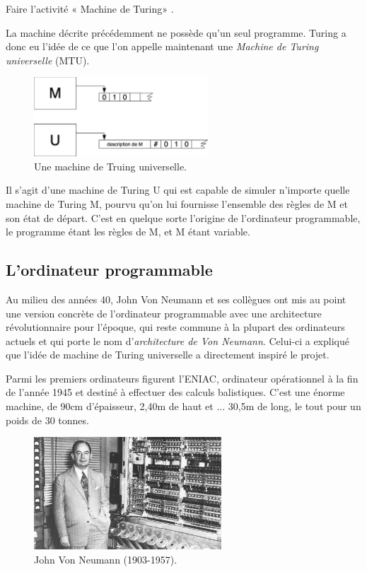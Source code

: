 \begin{exercice}[]
    Faire l'activité « Machine de Turing» .
\end{exercice}

La machine décrite précédemment ne possède qu'un seul programme. Turing a donc eu l'idée de ce que l'on appelle maintenant une
\textit{Machine de Turing universelle} (MTU).

\begin{figure}[H]
    \begin{center}
        \includegraphics[width=6.5cm]{ch-turing/img/mtu.png}
    \end{center}
    \caption*{Une machine de Truing universelle.}
\end{figure}

Il s'agit d'une machine de Turing U qui est capable de simuler n'importe quelle machine de Turing M,
pourvu qu'on lui fournisse l'ensemble des règles de M et son état de départ. C'est en quelque sorte l'origine de l'ordinateur
programmable, le programme étant les règles de M, et M étant variable.

\subsection{L'ordinateur programmable}

Au milieu des années 40, John Von Neumann et ses collègues ont mis au point une version concrète de l'ordinateur programmable avec une architecture révolutionnaire pour l'époque, qui reste commune à la plupart des ordinateurs actuels et qui porte le nom d'\textit{architecture de Von Neumann}. Celui-ci a expliqué que l'idée de machine de Turing universelle a directement inspiré le projet.

Parmi les premiers ordinateurs figurent l'ENIAC, ordinateur opérationnel à la fin de l'année 1945 et destiné à effectuer des calculs balistiques. C'est une énorme machine, de 90cm d'épaisseur, 2,40m de haut et ... 30,5m de long, le tout pour un poids de 30 tonnes.

\begin{figure}[H]
    \begin{center}
        \includegraphics[width=7cm]{ch-turing/img/vonneumann}
    \end{center}
    \caption*{John Von Neumann (1903-1957).}
\end{figure}

